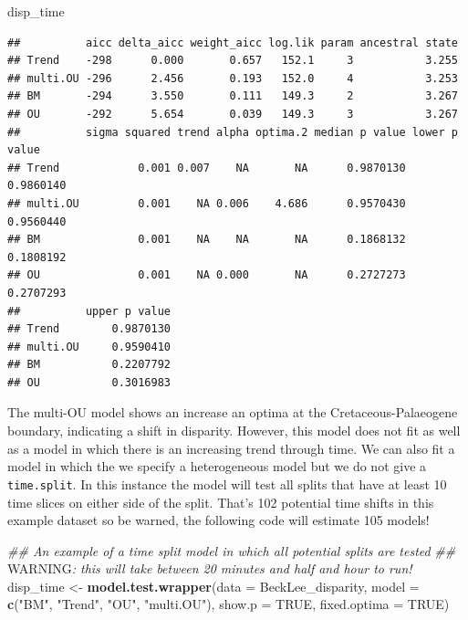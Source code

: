 \documentclass[
]{book}
\newenvironment{Shaded}{\begin{snugshade}}{\end{snugshade}}
\newcommand{\AlertTok}[1]{\textcolor[rgb]{0.94,0.16,0.16}{#1}}
\newcommand{\CommentTok}[1]{\textcolor[rgb]{0.56,0.35,0.01}{\textit{#1}}}
\newcommand{\DataTypeTok}[1]{\textcolor[rgb]{0.13,0.29,0.53}{#1}}
\newcommand{\KeywordTok}[1]{\textcolor[rgb]{0.13,0.29,0.53}{\textbf{#1}}}
\newcommand{\NormalTok}[1]{#1}
\newcommand{\OtherTok}[1]{\textcolor[rgb]{0.56,0.35,0.01}{#1}}
\newcommand{\StringTok}[1]{\textcolor[rgb]{0.31,0.60,0.02}{#1}}
\begin{document}
\begin{Shaded}
\begin{Highlighting}[]
\NormalTok{disp\_time}
\end{Highlighting}
\end{Shaded}

\begin{verbatim}
##          aicc delta_aicc weight_aicc log.lik param ancestral state
## Trend    -298      0.000       0.657   152.1     3           3.255
## multi.OU -296      2.456       0.193   152.0     4           3.253
## BM       -294      3.550       0.111   149.3     2           3.267
## OU       -292      5.654       0.039   149.3     3           3.267
##          sigma squared trend alpha optima.2 median p value lower p value
## Trend            0.001 0.007    NA       NA      0.9870130     0.9860140
## multi.OU         0.001    NA 0.006    4.686      0.9570430     0.9560440
## BM               0.001    NA    NA       NA      0.1868132     0.1808192
## OU               0.001    NA 0.000       NA      0.2727273     0.2707293
##          upper p value
## Trend        0.9870130
## multi.OU     0.9590410
## BM           0.2207792
## OU           0.3016983
\end{verbatim}

The multi-OU model shows an increase an optima at the Cretaceous-Palaeogene boundary, indicating a shift in disparity.
However, this model does not fit as well as a model in which there is an increasing trend through time.
We can also fit a model in which the we specify a heterogeneous model but we do not give a \texttt{time.split}.
In this instance the model will test all splits that have at least 10 time slices on either side of the split.
That's 102 potential time shifts in this example dataset so be warned, the following code will estimate 105 models!

\begin{Shaded}
\begin{Highlighting}[]
\CommentTok{\#\# An example of a time split model in which all potential splits are tested}
\CommentTok{\#\# }\AlertTok{WARNING}\CommentTok{: this will take between 20 minutes and half and hour to run!}
\NormalTok{disp\_time \textless{}{-}}\StringTok{ }\KeywordTok{model.test.wrapper}\NormalTok{(}\DataTypeTok{data =}\NormalTok{ BeckLee\_disparity,}
                        \DataTypeTok{model =} \KeywordTok{c}\NormalTok{(}\StringTok{"BM"}\NormalTok{, }\StringTok{"Trend"}\NormalTok{, }\StringTok{"OU"}\NormalTok{, }\StringTok{"multi.OU"}\NormalTok{),}
                                \DataTypeTok{show.p =} \OtherTok{TRUE}\NormalTok{, }\DataTypeTok{fixed.optima =} \OtherTok{TRUE}\NormalTok{)}
\end{Highlighting}
\end{Shaded}
\end{document}

